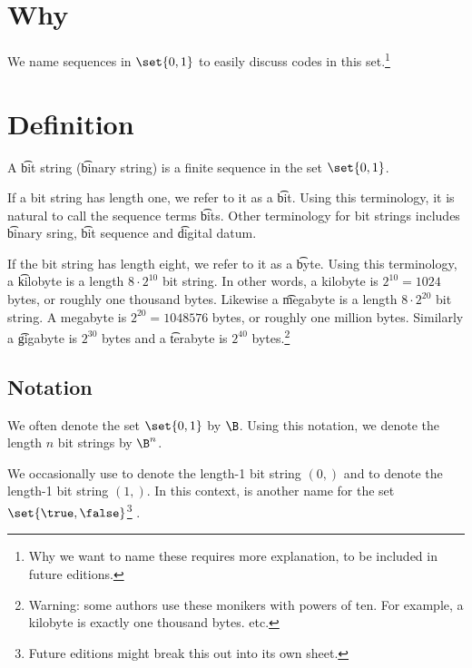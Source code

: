 

\section*{Why}

We name sequences in $\set{0, 1}$ to easily discuss codes in this set.\footnote{Why we want to name these requires more explanation, to be included in future editions.}

\section*{Definition}

A \t{bit string} (\t{binary string}) is a finite sequence in the set $\set{0, 1}$.

If a bit string has length one, we refer to it as a \t{bit}.
Using this terminology, it is natural to call the sequence terms \t{bits}.
Other terminology for bit strings includes \t{binary sring}, \t{bit sequence} and \t{digital datum}.

If the bit string has length eight, we refer to it as a \t{byte}.
Using this terminology, a \t{kilobyte} is a length $8 \cdot 2^{10}$ bit string.
In other words, a kilobyte is $2^{10} = 1024$ bytes, or roughly one thousand bytes.
Likewise a \t{megabyte} is a length $8 \cdot 2^{20}$ bit string.
A megabyte is $2^{20} = 1048576$ bytes, or roughly one million bytes.
Similarly a \t{gigabyte} is $2^{30}$ bytes and a \t{terabyte} is $2^{40}$ bytes.\footnote{Warning: some authors use these monikers with powers of ten. For example, a kilobyte is exactly one thousand bytes. etc.}

\subsection*{Notation}

We often denote the set $\set{0,1}$ by $\B$.
Using this notation, we denote the length $n$ bit strings by $\B^n$.

We occasionally use \false to denote the length-1 bit string $(0,)$ and \true to denote the length-1 bit string $(1,)$.
In this context, \bool is another name for the set $\set{\true, \false}$\footnote{Future editions might break this out into its own sheet.}
.

\blankpage